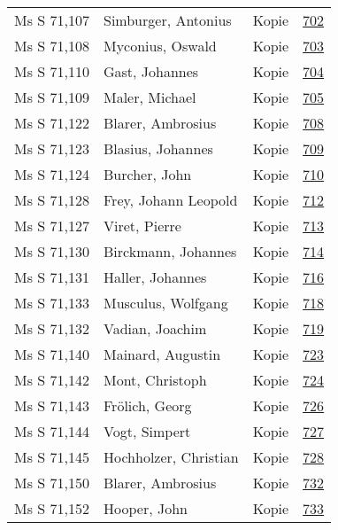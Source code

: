 \documentclass[10pt,a4paper,landscape]{report}
\begin{document}
\begin{longtable}{p{16cm}p{4cm}lr}
Ms S 71,107	&	Simburger, Antonius	&	Kopie	&	\href{http://130.60.24.72/assignment/702}{702}\\
Ms S 71,108	&	Myconius, Oswald	&	Kopie	&	\href{http://130.60.24.72/assignment/703}{703}\\
Ms S 71,110	&	Gast, Johannes	&	Kopie	&	\href{http://130.60.24.72/assignment/704}{704}\\
Ms S 71,109	&	Maler, Michael	&	Kopie	&	\href{http://130.60.24.72/assignment/705}{705}\\
Ms S 71,122	&	Blarer, Ambrosius	&	Kopie	&	\href{http://130.60.24.72/assignment/708}{708}\\
Ms S 71,123	&	Blasius, Johannes	&	Kopie	&	\href{http://130.60.24.72/assignment/709}{709}\\
Ms S 71,124	&	Burcher, John	&	Kopie	&	\href{http://130.60.24.72/assignment/710}{710}\\
Ms S 71,128	&	Frey, Johann Leopold	&	Kopie	&	\href{http://130.60.24.72/assignment/712}{712}\\
Ms S 71,127	&	Viret, Pierre	&	Kopie	&	\href{http://130.60.24.72/assignment/713}{713}\\
Ms S 71,130	&	Birckmann, Johannes	&	Kopie	&	\href{http://130.60.24.72/assignment/714}{714}\\
Ms S 71,131	&	Haller, Johannes	&	Kopie	&	\href{http://130.60.24.72/assignment/716}{716}\\
Ms S 71,133	&	Musculus, Wolfgang	&	Kopie	&	\href{http://130.60.24.72/assignment/718}{718}\\
Ms S 71,132	&	Vadian, Joachim	&	Kopie	&	\href{http://130.60.24.72/assignment/719}{719}\\
Ms S 71,140	&	Mainard, Augustin	&	Kopie	&	\href{http://130.60.24.72/assignment/723}{723}\\
Ms S 71,142	&	Mont, Christoph	&	Kopie	&	\href{http://130.60.24.72/assignment/724}{724}\\
Ms S 71,143	&	Frölich, Georg	&	Kopie	&	\href{http://130.60.24.72/assignment/726}{726}\\
Ms S 71,144	&	Vogt, Simpert	&	Kopie	&	\href{http://130.60.24.72/assignment/727}{727}\\
Ms S 71,145	&	Hochholzer, Christian	&	Kopie	&	\href{http://130.60.24.72/assignment/728}{728}\\
Ms S 71,150	&	Blarer, Ambrosius	&	Kopie	&	\href{http://130.60.24.72/assignment/732}{732}\\
Ms S 71,152	&	Hooper, John	&	Kopie	&	\href{http://130.60.24.72/assignment/733}{733}\\

\end{longtable}
\end{document}
